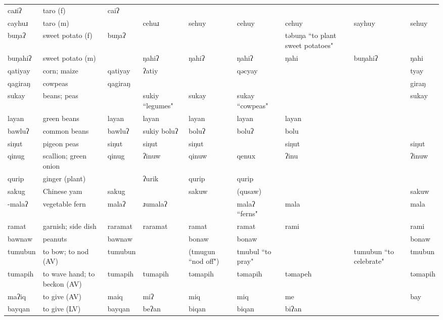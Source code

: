 \begin{landscape}
\begin{longtable}{*{9}{>{\raggedright\arraybackslash}p{}}}
\text{*}caɹiʔ & taro (f) & caiʔ &  &  &  &  &  & \\
\text{*}cayhuɹ & taro (m) &  & cehuɹ & sehuy & cehuy & cehuy & sayhuy & sehuy\\
\text{*}buŋaʔ & sweet potato (f) & buŋaʔ &  &  &  & təbuŋa \newline ``to plant sweet potatoes" &  & \\
\text{*}buŋahiʔ & sweet potato (m) &  & ŋahiʔ & ŋahiʔ & ŋahiʔ & ŋahi & buŋahiʔ & ŋahi\\
\text{*}qatiyay & corn; maize & qatiyay & ʔatiy &  & qəcyay &  &  & tyay\\
\text{*}qagiraŋ & cowpeas & qagiraŋ &  &  &  &  &  & giraŋ\\
\text{*}sukay & beans; peas &  & sukiy ``legumes" & sukay & sukay \newline ``cowpeas" &  &  & sukay\\
\text{*}layan & green beans & layan & layan & layan & layan & layan &  & \\
\text{*}bawluʔ & common beans & bawluʔ & sukiy boluʔ & boluʔ & boluʔ & bolu &  & \\
\text{*}siŋut & pigeon peas & siŋut & siŋut & siŋut &  & siŋut &  & siŋut\\
\text{*}qinug & scallion; green onion & qinug & ʔinuw & qinuw & qenux & ʔinu &  & ʔinuw\\
\text{*}qurip & ginger (plant) &  & ʔurik & qurip & qurip &  &  & \\
\text{*}sakug & Chinese yam & sakug &  & sakuw & (qusaw) &  &  & sakuw\\
\text{*}-malaʔ & vegetable fern & malaʔ & ɹumalaʔ &  & malaʔ ``ferns" & mala &  & mala\\
\text{*}ramat & garnish; side dish & raramat & raramat & ramat & ramat & rami &  & rami\\
\text{*}bawnaw & peanuts & bawnaw &  & bonaw & bonaw &  &  & bonaw\\
\text{*}tumubun & to bow; to nod (AV) & tumubun &  & (tmugun \newline ``nod off") & tmubul \newline ``to pray" &  & tumubun \newline ``to celebrate" & tmubun\\
\text{*}tumapih & to wave hand; to beckon (AV) & tumapih & tumapih & təmapih & təmapih & təmapeh &  & təmapih\\
\text{*}maʔiq & to give (AV) & maiq & miʔ & miq & miq & me &  & bay\\
\text{*}bayqan & to give (LV) & bayqan & beʔan & biqan & biqan & biʔan &  & \\

\end{longtable}
\end{landscape}

